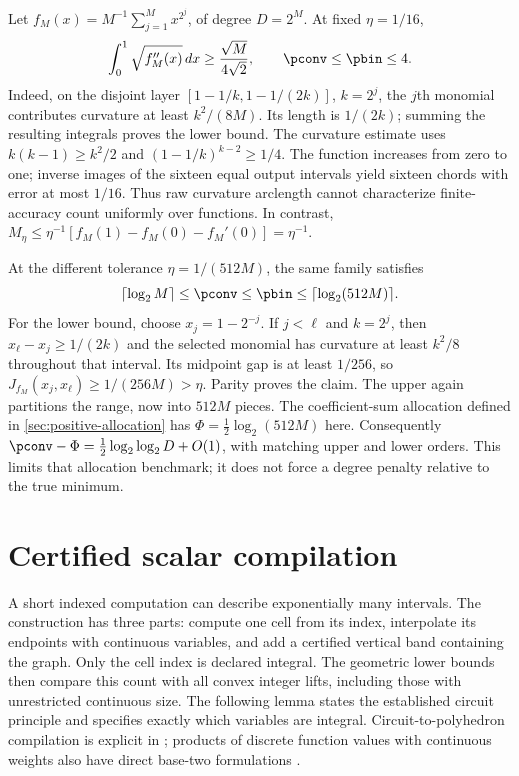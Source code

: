 \begin{example}
\label{ex:positive-degree-gap}
Let $f_M(x)=M^{-1}\sum_{j=1}^M x^{2^j}$, of degree $D=2^M$.
At fixed $\eta=1/16$,
\begin{equation}\label{eq:raw-curvature-obstruction}
 \int_0^1\sqrt{f_M''(x)}\,dx\ge\frac{\sqrt M}{4\sqrt2},
 \qquad \pconv\le\pbin\le4.
\end{equation}
Indeed, on the disjoint layer
$[1-1/k,1-1/(2k)]$, $k=2^j$, the $j$th monomial contributes curvature
at least $k^2/(8M)$. Its length is $1/(2k)$; summing the resulting
integrals proves the lower bound. The curvature estimate uses
$k(k-1)\ge k^2/2$ and $(1-1/k)^{k-2}\ge1/4$.
The function increases from zero to one; inverse images of the sixteen
equal output intervals yield sixteen chords with error at most $1/16$.
Thus raw curvature arclength cannot characterize finite-accuracy count
uniformly over functions. In contrast,
$M_\eta\le\eta^{-1}[f_M(1)-f_M(0)-f_M'(0)]=\eta^{-1}$.

At the different tolerance $\eta=1/(512M)$, the same family satisfies
\begin{equation}\label{eq:degree-allocation-obstruction}
 \lceil\log_2M\rceil\le\pconv\le\pbin
 \le\lceil\log_2(512M)\rceil.
\end{equation}
For the lower bound, choose $x_j=1-2^{-j}$. If $j<\ell$ and $k=2^j$,
then $x_\ell-x_j\ge1/(2k)$ and the selected monomial has curvature
at least $k^2/8$ throughout that interval. Its midpoint gap is at least
$1/256$, so $J_{f_M}(x_j,x_\ell)\ge1/(256M)>\eta$. Parity proves
the claim. The upper again partitions the range, now into $512M$ pieces.
The coefficient-sum allocation defined in \cref{sec:positive-allocation}
has $\Phi=\frac12\log_2(512M)$ here. Consequently
$\pconv-\Phi=\frac12\log_2\log_2D+O(1)$, with matching upper
and lower orders. This limits that allocation benchmark; it does not
force a degree penalty relative to the true minimum.
\end{example}

\section{Certified scalar compilation}\label{sec:scalar-compilation}

A short indexed computation can describe exponentially many intervals.
The construction has three parts: compute one cell from its index,
interpolate its endpoints with continuous variables, and add a certified
vertical band containing the graph. Only the cell index is declared
integral. The geometric lower bounds then compare this count with all
convex integer lifts, including those with unrestricted continuous size.
The following lemma states the established circuit principle and
specifies exactly which variables are integral. Circuit-to-polyhedron
compilation is explicit in \citet[Section 3, Lemma 1]{avis2019};
products of discrete function values with continuous weights also have
direct base-two formulations \citep[Section 2]{adams2012}.

